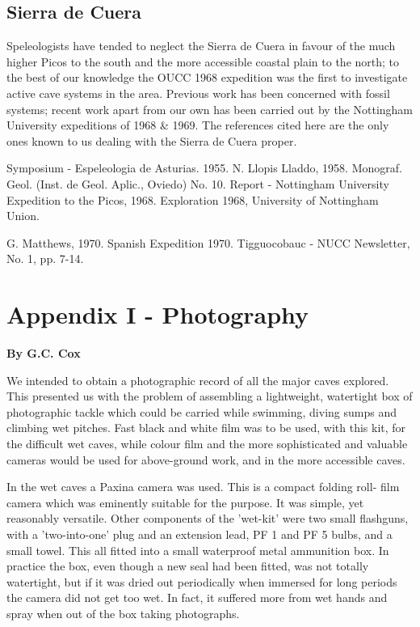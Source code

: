 \documentclass[11pt, a4paper, twoside]{memoir}
\begin{document}
\section*{Sierra de Cuera}

Speleologists have tended to neglect the Sierra de Cuera in favour of the much higher Picos to the south and the more accessible coastal plain to the north; to the best of our knowledge the OUCC 1968 expedition was the first to investigate active cave systems in the area. Previous work has been concerned with fossil systems; recent work apart from our own has been carried out by the Nottingham University expeditions of 1968 \& 1969. The references cited here are the only ones known to us dealing with the Sierra de Cuera proper.

Symposium - Espeleologia de Asturias. 1955. N. Llopis Lladdo, 1958. Monograf. Geol. (Inst. de Geol. Aplic., Oviedo) No. 10.
Report - Nottingham University Expedition to the Picos, 1968. Exploration 1968, University of Nottingham Union.

G. Matthews, 1970. Spanish Expedition 1970. Tigguocobauc - NUCC Newsletter, No. 1, pp. 7-14.


\chapter*{Appendix I - Photography}
\textbf{By G.C. Cox}

We intended to obtain a photographic record of all the major caves explored. This presented us with the problem of assembling a lightweight, watertight box of photographic tackle which could be carried while swimming, diving sumps and climbing wet pitches. Fast black and white film was to be used, with this kit, for the difficult wet caves, while colour film and the more sophisticated and valuable cameras would be used for above-ground work, and in the more accessible caves.

In the wet caves a Paxina camera was used. This is a compact folding roll- film camera which was eminently suitable for the purpose. It was simple, yet reasonably versatile. Other components of the 'wet-kit' were two small flashguns, with a 'two-into-one' plug and an extension lead, PF 1 and PF 5 bulbs, and a small towel. This all fitted into a small waterproof metal ammunition box. In practice the box, even though a new seal had been fitted, was not totally watertight, but if it was dried out periodically when immersed for long periods the camera did not get too wet. In fact, it suffered more from wet hands and spray when out of the box taking photographs.
\end{document}
